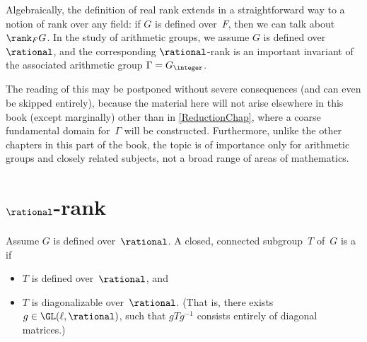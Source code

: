 
 \label{QrankChap}


Algebraically, the definition of real rank extends in a straightforward way to a notion of rank over any field: if $G$ is defined over~$F$, then we can talk about $\rank_F G$. In the study of arithmetic groups, we assume $G$ is defined over~$\rational$, and the corresponding $\rational$-rank is an important invariant of the associated arithmetic group $\Gamma = G_\integer$.

\begingroup \smaller \renewcommand{\baselinestretch}{0.95}
\begin{disclaimer}
The reading of this  may be postponed without severe consequences (and can even be skipped entirely), because the material here will not arise elsewhere in this book (except marginally) other than in \cref{ReductionChap}, where a coarse fundamental domain for~$\Gamma$ will be constructed. Furthermore, unlike the other chapters in this part of the book, the topic is of importance only for arithmetic groups and closely related subjects, not a broad range of areas of mathematics.
\end{disclaimer}
\par \endgroup

\section{\texorpdfstring{$\rational$}{Q}-rank}

\begin{defn} %
Assume $G$ is defined over~$\rational$.
 A closed, connected subgroup~$T$ of~$G$ is a 
  if
 \noprelistbreak
 \begin{itemize}
 \item $T$ is defined over~$\rational$, and
 \item $T$ is diagonalizable over~$\rational$. (That is,
there exists $g \in \GL(\ell,\rational)$, such that $g
T g^{-1}$ consists entirely of diagonal matrices.)
 \end{itemize}
 \end{defn}

